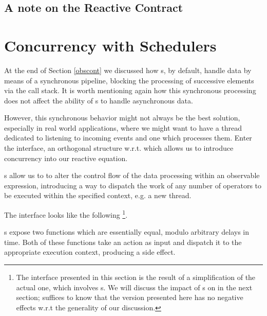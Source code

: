 \subsection{A note on the Reactive Contract}

\section{Concurrency with Schedulers}
\label{schedulers}

At the end of Section \ref{obscont} we discussed how s, by default, handle data by means of a synchronous pipeline, blocking the processing of successive elements via the call stack. It is worth mentioning again how this synchronous processing does not affect the ability of s to handle asynchronous data.

However, this synchronous behavior might not always be the best solution, especially in real world applications, where we might want to have a thread dedicated to listening to incoming events and one which processes them. Enter the  interface, an orthogonal\cite{wiki:orthogonality} structure w.r.t.  which allows us to introduce concurrency into our reactive equation. 

s allow us to to alter the control flow of the data processing within an observable expression, introducing a way to dispatch the work of any number of operators to be executed within the specified context, e.g. a new thread.

The  interface looks like the following \footnote{The interface presented in this section is the result of a simplification of the actual one, which involves s. We will discuss the impact of s on  in the next section; suffices to know that the version presented here has no negative effects w.r.t the generality of our discussion.}.


s expose two functions which are essentially equal, modulo arbitrary delays in time. Both of these functions take an  action as input and dispatch it to the appropriate execution context, producing a side effect. 

